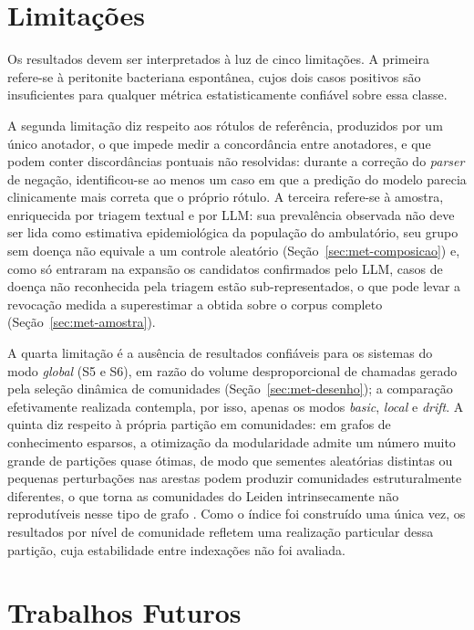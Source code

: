 \section{Limitações}\label{sec:conc-limitacoes}

Os resultados devem ser interpretados à luz de cinco limitações. A primeira refere-se à peritonite bacteriana espontânea, cujos dois casos positivos são insuficientes para qualquer métrica estatisticamente confiável sobre essa classe.

A segunda limitação diz respeito aos rótulos de referência, produzidos por um único anotador, o que impede medir a concordância entre anotadores, e que podem conter discordâncias pontuais não resolvidas: durante a correção do \textit{parser} de negação, identificou-se ao menos um caso em que a predição do modelo parecia clinicamente mais correta que o próprio rótulo. A terceira refere-se à amostra, enriquecida por triagem textual e por LLM: sua prevalência observada não deve ser lida como estimativa epidemiológica da população do ambulatório, seu grupo sem doença não equivale a um controle aleatório (Seção~\ref{sec:met-composicao}) e, como só entraram na expansão os candidatos confirmados pelo LLM, casos de doença não reconhecida pela triagem estão sub-representados, o que pode levar a revocação medida a superestimar a obtida sobre o corpus completo (Seção~\ref{sec:met-amostra}).

A quarta limitação é a ausência de resultados confiáveis para os sistemas do modo \textit{global} (S5 e S6), em razão do volume desproporcional de chamadas gerado pela seleção dinâmica de comunidades (Seção~\ref{sec:met-desenho}); a comparação efetivamente realizada contempla, por isso, apenas os modos \textit{basic}, \textit{local} e \textit{drift}. A quinta diz respeito à própria partição em comunidades: em grafos de conhecimento esparsos, a otimização da modularidade admite um número muito grande de partições quase ótimas, de modo que sementes aleatórias distintas ou pequenas perturbações nas arestas podem produzir comunidades estruturalmente diferentes, o que torna as comunidades do Leiden intrinsecamente não reprodutíveis nesse tipo de grafo \citep{hossain2026}. Como o índice foi construído uma única vez, os resultados por nível de comunidade refletem uma realização particular dessa partição, cuja estabilidade entre indexações não foi avaliada.

\section{Trabalhos Futuros}\label{sec:conc-futuros}


